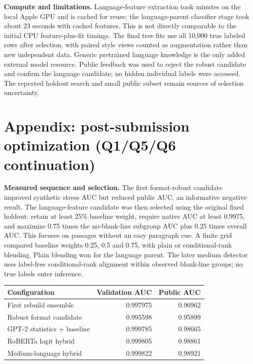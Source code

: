 \documentclass[10pt,letterpaper]{article}
\begin{document}
\textbf{Compute and limitations.} Language-feature extraction took minutes on the local Apple GPU and is cached for reuse; the language-parent classifier stage took about 23 seconds with cached features. This is not directly comparable to the initial CPU feature-plus-fit timings. The final tree fits use all 10,000 true labeled rows after selection, with paired style views counted as augmentation rather than new independent data. Generic pretrained language knowledge is the only added external model resource. Public feedback was used to reject the robust candidate and confirm the language candidate; no hidden individual labels were accessed. The repeated holdout search and small public subset remain sources of selection uncertainty.

\newpage
\section*{Appendix: post-submission optimization (Q1/Q5/Q6 continuation)}
\textbf{Measured sequence and selection.} The first format-robust candidate improved synthetic stress AUC but reduced public AUC, an informative negative result. The language-feature candidate was then selected using the original fixed holdout: retain at least 25\% baseline weight, require native AUC at least 0.9975, and maximize 0.75 times the no-blank-line subgroup AUC plus 0.25 times overall AUC. This focuses on passages without an easy paragraph cue. A finite grid compared baseline weights 0.25, 0.5 and 0.75, with plain or conditional-rank blending. Plain blending won for the language parent. The later medium detector uses label-free conditional-rank alignment within observed blank-line groups; no true labels enter inference.

\par\noindent
\begin{tabularx}{\linewidth}{@{}Yrr@{}}
\toprule
Configuration & Validation AUC & Public AUC \\ \midrule
First rebuild ensemble & 0.997975 & 0.96962 \\
Robust format candidate & 0.995598 & 0.95899 \\
GPT-2 statistics + baseline & 0.999785 & 0.98665 \\
RoBERTa logit hybrid & 0.999805 & 0.98861 \\
Medium-language hybrid & 0.999822 & 0.98921 \\
\bottomrule
\end{tabularx}
\end{document}
